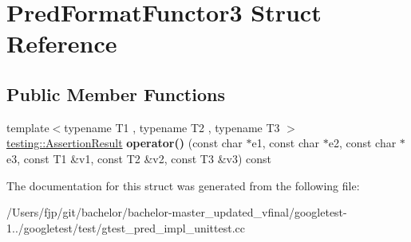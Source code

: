 \hypertarget{struct_pred_format_functor3}{}\section{Pred\+Format\+Functor3 Struct Reference}
\label{struct_pred_format_functor3}
\subsection*{Public Member Functions}
\begin{DoxyCompactItemize}
\item 
\mbox{\label{struct_pred_format_functor3_a35575b0ed1e572d3a31603b07a3f6b30}} 
{\footnotesize template$<$typename T1 , typename T2 , typename T3 $>$ }\\\mbox{\hyperlink{classtesting_1_1_assertion_result}{testing\+::\+Assertion\+Result}} {\bfseries operator()} (const char $\ast$e1, const char $\ast$e2, const char $\ast$e3, const T1 \&v1, const T2 \&v2, const T3 \&v3) const
\end{DoxyCompactItemize}


The documentation for this struct was generated from the following file\+:\begin{DoxyCompactItemize}
\item 
/\+Users/fjp/git/bachelor/bachelor-\/master\+\_\+updated\+\_\+vfinal/googletest-\/1../googletest/test/gtest\+\_\+pred\+\_\+impl\+\_\+unittest.\+cc\end{DoxyCompactItemize}
